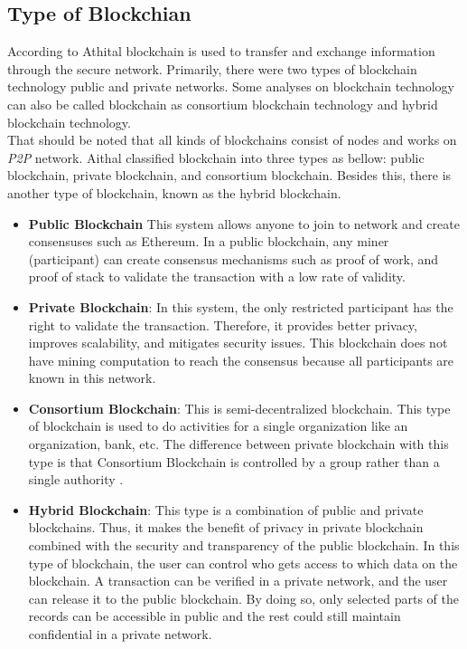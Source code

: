 \subsection{Type of Blockchian}
According to Athital\cite{Athital} blockchain is used to transfer and exchange information through the secure network. Primarily, there were two types of blockchain technology public and private networks. Some analyses on blockchain technology can also be called blockchain as consortium blockchain technology and hybrid blockchain technology. \\
That should be noted that all kinds of blockchains consist of nodes and works on \textit{P2P} network. Aithal \cite{Aithal} classified blockchain into three types as bellow: public blockchain, private blockchain, and consortium blockchain. Besides this, there is another type of blockchain, known as the hybrid blockchain.
\begin{itemize}
    \item \textbf{Public Blockchain}
    This system allows anyone to join to network and create consensuses such as Ethereum. In a public blockchain, any miner (participant) can create consensus mechanisms such as proof of work, and proof of stack to validate the transaction with a low rate of validity\cite{Kalra}.
    \item \textbf{Private Blockchain}: In this system, the only restricted participant has the right to validate the transaction. Therefore, it provides better privacy, improves scalability, and mitigates security issues. This blockchain does not have mining computation to reach the consensus because all participants are known in this network\cite{Kalra}. 
    \item \textbf{Consortium Blockchain}: This is semi-decentralized blockchain. This type of blockchain is used to do activities for a single organization like an organization, bank, etc. The difference between private blockchain with this type is that Consortium Blockchain is controlled by a group rather than a single authority \cite{Aithal}.
    \item \textbf{Hybrid Blockchain}: This type is a combination of public and private blockchains. Thus, it makes the benefit of privacy in private blockchain combined with the security and transparency of the public blockchain. In this type of blockchain, the user can control who gets access to which data on the blockchain. A transaction can be verified in a private network, and the user can release it to the public blockchain. By doing so, only selected parts of the records can be accessible in public and the rest could still maintain confidential in a private network\cite{Aithal}. 
\end{itemize}

